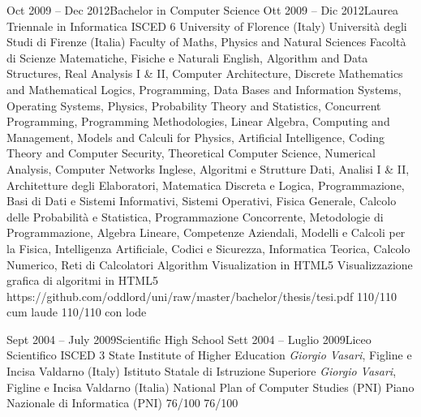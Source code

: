 {    \school
    {Oct 2009 -- Dec 2012}{Bachelor in Computer Science}
    {Ott 2009 -- Dic 2012}{Laurea Triennale in Informatica}
    {ISCED 6}
      \schoolLocation
        {University of Florence (Italy)}
        {Università degli Studi di Firenze (Italia)}
      \schoolFaculty
        {Faculty of Maths, Physics and Natural Sciences}
        {Facoltà di Scienze Matematiche, Fisiche e Naturali}
      \courses
        {English, Algorithm and Data Structures, Real Analysis I \& II, Computer Architecture, Discrete Mathematics and Mathematical Logics, Programming, Data Bases and Information Systems, Operating Systems, Physics, Probability Theory and Statistics, Concurrent Programming, Programming Methodologies, Linear Algebra, Computing and Management, Models and Calculi for Physics, Artificial Intelligence, Coding Theory and Computer Security, Theoretical Computer Science, Numerical Analysis, Computer Networks}
        {Inglese, Algoritmi e Strutture Dati, Analisi I \& II, Architetture degli Elaboratori, Matematica Discreta e Logica, Programmazione, Basi di Dati e Sistemi Informativi, Sistemi Operativi, Fisica Generale, Calcolo delle Probabilità e Statistica, Programmazione Concorrente, Metodologie di Programmazione, Algebra Lineare, Competenze Aziendali, Modelli e Calcoli per la Fisica, Intelligenza Artificiale, Codici e Sicurezza, Informatica Teorica, Calcolo Numerico, Reti di Calcolatori}
      \thesisURL
        {Algorithm Visualization in HTML5}
        {Visualizzazione grafica di algoritmi in HTML5}
        {https://github.com/oddlord/uni/raw/master/bachelor/thesis/tesi.pdf}
      \finalRank
        {110/110 cum laude}
        {110/110 con lode}
    
    \school
    {Sept 2004 -- July 2009}{Scientific High School}
    {Sett 2004 -- Luglio 2009}{Liceo Scientifico}
    {ISCED 3}
      \schoolLocation
        {State Institute of Higher Education \textit{Giorgio Vasari}, Figline e Incisa Valdarno (Italy)}
        {Istituto Statale di Istruzione Superiore \textit{Giorgio Vasari}, Figline e Incisa Valdarno (Italia)}
      \schoolFaculty
        {National Plan of Computer Studies (PNI)}
        {Piano Nazionale di Informatica (PNI)}
      \finalRank
        {76/100}
        {76/100}


}

